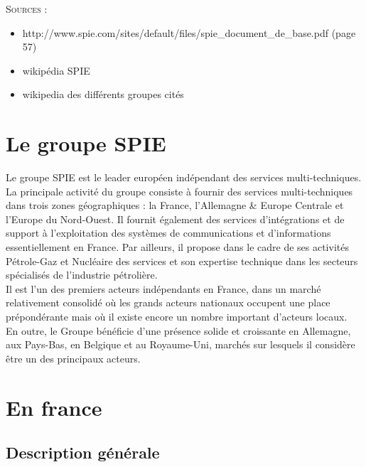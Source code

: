 \begin{shaded}
    \textsc{Sources} :
    \begin{itemize}
        \item[\textbullet] http://www.spie.com/sites/default/files/spie\_document\_de\_base.pdf (page 57)
        \item[\textbullet] wikipédia SPIE
        \item[\textbullet] wikipedia des différents groupes cités
    \end{itemize}
\end{shaded}

\section{Le groupe SPIE}

Le groupe SPIE est le leader européen indépendant des services multi-techniques. \\

La principale activité du groupe consiste à fournir des services multi-techniques dans trois zones géographiques : la France, l’Allemagne \& Europe Centrale et l’Europe du Nord-Ouest. Il fournit également des services d’intégrations et de support à l’exploitation des systèmes de communications et d’informations essentiellement en France. Par ailleurs, il propose  dans le cadre de ses activités Pétrole-Gaz et Nucléaire des services et son expertise technique dans les secteurs spécialisés de l’industrie pétrolière. \\

Il est l’un des premiers acteurs indépendants en France, dans un marché relativement consolidé où les grands acteurs nationaux occupent une place prépondérante mais où il existe encore un nombre important d’acteurs locaux. \\ 

En outre, le Groupe bénéficie d’une présence solide et croissante en Allemagne, aux Pays-Bas, en Belgique et au Royaume-Uni, marchés sur lesquels il considère être un des principaux acteurs.

\section{En france}

\subsection{Description générale}

